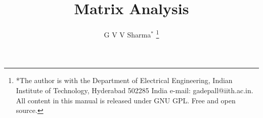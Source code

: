 \documentclass[journal,12pt,onecolumn]{IEEEtran}
\begin{document}
\let\StandardTheFigure\thefigure
\let\vec\mathbf
\renewcommand{\thefigure}{\theproblem}



\def\putbox#1#2#3{\makebox[0in][l]{\makebox[#1][l]{}\raisebox{\baselineskip}[0in][0in]{\raisebox{#2}[0in][0in]{#3}}}}
     \def\rightbox#1{\makebox[0in][r]{#1}}
     \def\centbox#1{\makebox[0in]{#1}}
     \def\topbox#1{\raisebox{-\baselineskip}[0in][0in]{#1}}
     \def\midbox#1{\raisebox{-0.5\baselineskip}[0in][0in]{#1}}

\vspace{3cm}

\title{
	Matrix Analysis
}
\author{ G V V Sharma$^{*}$%
	\thanks{*The author is with the Department
		of Electrical Engineering, Indian Institute of Technology, Hyderabad
		502285 India e-mail:  gadepall@iith.ac.in. All content in this manual is released under GNU GPL.  Free and open source.}
	
}	


%
%
%

% 
%
\end{document}

